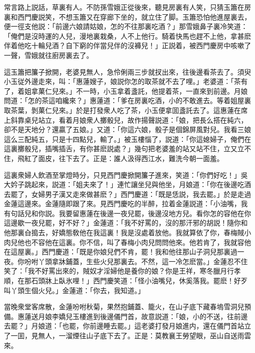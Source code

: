 常言路上説話，草裏有人。不防孫雪娥正從後來，聽見房裏有人笑，只猜玉簫在房裏和西門慶説笑，不想玉簫又在穿廊下坐的，就立住了脚。玉簫恐怕他進屋裏去，便一徑支他説：「前邊六娘請姑娘，怎的不往那裏吃酒？」那雪娥鼻子裏冷笑道：「俺們是沒時運的人兒，漫地裏栽桑，人不上他行。騎着快馬也趕不上他，拿甚麽伴着他吃十輪兒酒？自下窮的伴當兒伴的沒褲兒！」正説着，被西門慶房中咳嗽了一聲，雪娥就往廚房裏去了。

這玉簫把簾子掀開，老婆見無人，急伶俐兩三步就扠出來，往後邊看茶去了。須臾小玉従外邊走來，叫：「惠蓮嫂子，娘説你怎的取茶就不去了哩。」老婆道：「茶有了，着姐拿菓仁兒來。」不一時，小玉拿着盞託，他提着茶，一直來到前邊。月娘問道：「怎的茶這咱纔來？」惠蓮道：「爹在房裏吃酒，小的不敢進去。等着姐屋裏取茶葉，剝菓仁兒來。」於是打發衆人吃了茶，小玉便拿囬盞託去了。這惠蓮在席上斜靠桌兒站立，看着月娘衆人擲骰兒，故作揚聲説道：「娘，把長么搭在純六，卻不是天地分？還贏了五娘。」又道：「你這六娘，骰子是個錦屏風對兒。我看三娘這么三配純五，只是十四點兒，輸了。」被玉樓惱了，説道：「你這媳婦子，俺們在這裏擲骰兒，插嘴插舌，有你甚麽説處？」幾句把老婆羞的站又站不住，立又立不住，飛紅了面皮，往下去了。正是：誰人汲得西江水，難洗今朝一面羞。

這裏衆婦人飲酒至掌燈時分，只見西門慶掀開簾子進來，笑道：「你們好吃！」吳大妗子跳起來，説道：「姐夫來了！」連忙讓坐兒與他坐，月娘道：「你在後邊吃酒去罷了，女婦男子漢又走來做甚麽？」西門慶道：「既是恁説，我去罷。」於是走過金蓮這邊來。金蓮隨即跟了來。見西門慶吃的半醉，拉着金蓮説道：「小油嘴，我有句話兒和你説。我要留惠蓮在後邊一夜兒罷，後邊沒地方兒。看你怎的容他在你這邊歇一夜兒罷，好不好？」金蓮道：「我不好罵的，沒的那汗邪的胡説！隨你和他那裏㒲搗去，好嬌態敎他在我這裏！我是沒處着放他。我就算依了你，春梅賊小肉兒他也不容他在這裏。你不信，叫了春梅小肉兒問問他來。他若肯了，我就容他在這屋裏。」西門慶道：「既是你娘兒們不肯，罷！我和他往那山子洞兒那裏過一夜。你吩咐丫頭拿牀鋪蓋，生些火兒那裏去。不然，這一冷怎麽當。」金蓮忍不住笑了：「我不好罵出來的，賊奴才淫婦他是養你的娘？你是王祥，寒冬臘月行孝順，在那石頭牀上臥氷哩！」西門慶笑道：「怪小油嘴兒，休奚落我。罷麽！好歹叫丫頭生個火兒。」金蓮道：「你去，我知道。」

當晚衆堂客席散，金蓮吩咐秋菊，果然抱鋪蓋、籠火，在山子底下藏春塢雪洞兒預備。惠蓮送月娘李嬌兒玉樓進到後邊儀門首，故意説道：「娘，小的不送，往前邊去罷？」月娘道：「也罷，你前邊睡去罷。」這老婆打發月娘進内，還在儀門首站立了一囬，見無人，一溜煙往山子底下去了。正是：莫教襄王勞望眼，巫山自送雨雲來。

